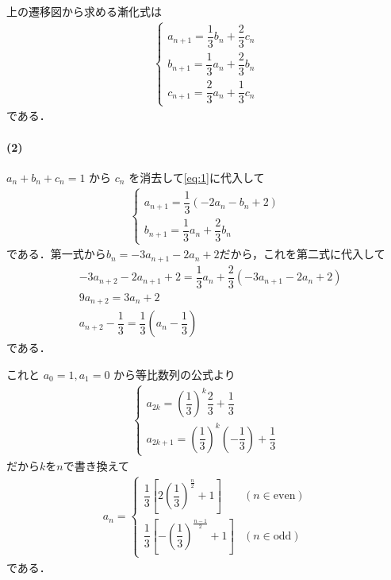 \documentclass[../../main.tex]{subfiles}
\begin{document}
上の遷移図から求める漸化式は
\begin{align}
  \begin{cases}
    a_{n+1} = \dfrac{1}{3} b_n + \dfrac{2}{3} c_n \\
    b_{n+1} = \dfrac{1}{3} a_n + \dfrac{2}{3} b_n \\
    c_{n+1} = \dfrac{2}{3} a_n + \dfrac{1}{3} c_n
  \end{cases} \label{eq:1}
\end{align}
である．

\paragraph{(2)}

$a_n + b_n + c_n = 1$ から $c_n$ を消去して\cref{eq:1}に代入して
\begin{align}
  \begin{cases}
    a_{n+1} = \dfrac{1}{3}(-2a_n - b_n + 2) \\
    b_{n+1} = \dfrac{1}{3}a_n + \dfrac{2}{3}b_n
  \end{cases} \label{eq:2}
\end{align}
である．第一式から$b_n = -3a_{n+1} - 2a_n + 2$だから，これを第二式に代入して
\begin{align}
  & -3a_{n+2} - 2a_{n+1} + 2 = \dfrac{1}{3}a_n + \dfrac{2}{3}(-3a_{n+1} - 2a_n + 2) \\
  & 9a_{n+2} = 3a_n + 2 \\
  & a_{n+2} - \dfrac{1}{3} = \dfrac{1}{3} \left(a_n - \dfrac{1}{3}\right)
\end{align}
である．

これと $a_0 = 1, a_1 = 0$ から等比数列の公式より
\begin{align}
  \begin{cases}
    a_{2k} = \left(\dfrac{1}{3}\right)^k \dfrac{2}{3} + \dfrac{1}{3} \\
    a_{2k+1} = \left(\dfrac{1}{3}\right)^k \left(-\dfrac{1}{3}\right) + \dfrac{1}{3}
  \end{cases}
\end{align}
だから$k$を$n$で書き換えて
\begin{align}
  a_n =
  \begin{cases}
    \dfrac{1}{3}\left[2\left(\dfrac{1}{3}\right)^{\frac{n}{2}} + 1\right] & (n \in \text{even}) \\ \dfrac{1}{3}\left[-\left(\dfrac{1}{3}\right)^{\frac{n-1}{2}} + 1\right] & (n \in \text{odd})
  \end{cases}
\end{align}
である．
\end{document}
